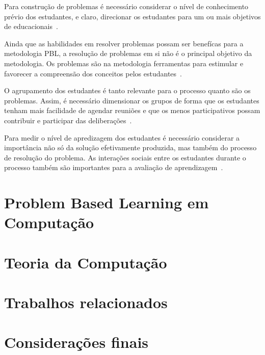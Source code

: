 Para construção de problemas é necessário considerar o nível de
conhecimento prévio dos estudantes, e claro, direcionar os estudantes
para um ou mais objetivos de educacionais~\cite{des1999delphi}.





Ainda que as habilidades em resolver problemas possam ser benefícas
para a metodologia PBL, a resolução de problemas em si não é o
principal objetivo da metodologia.
Os problemas são na metodologia ferramentas para estimular e
favorecer a compreensão dos conceitos pelos
estudantes~\cite{wood2003problem,amos1998problem}.

O agrupamento dos estudantes é tanto relevante para o processo quanto
são os problemas. Assim, é necessário dimensionar os grupos de forma
que os estudantes tenham mais facilidade de agendar reuniões e que
os menos participativos possam contribuir e participar das
deliberações~\cite{albanese2010problem}.

Para medir o nível de apredizagem dos estudantes é necessário considerar
a importância não só da solução efetivamente produzida, mas também do
processo de resolução do problema.
As interações sociais entre os estudantes durante
o processo também são importantes para a
avaliação de aprendizagem~\cite{albanese2010problem}.


\section{Problem Based Learning em Computação}
\section{Teoria da Computação}
\section{Trabalhos relacionados}
\section{Considerações finais}

